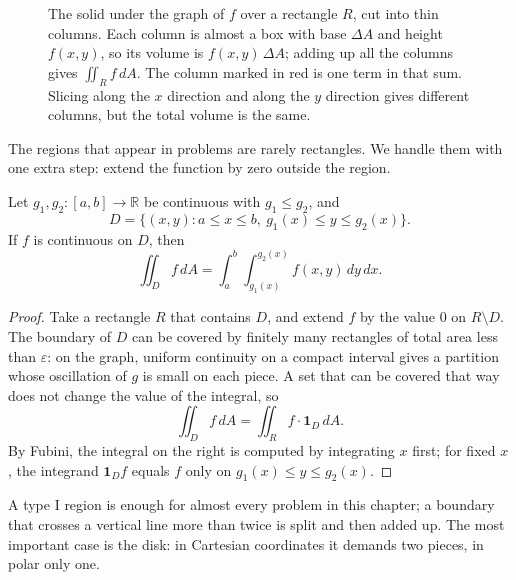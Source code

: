 \begin{figure}[htbp]
\caption{The solid under the graph of $f$ over a rectangle $R$, cut into
thin columns. Each column is almost a box with base $\Delta A$ and height
$f(x,y)$, so its volume is $f(x,y)\,\Delta A$; adding up all the columns gives
$\iint_R f\,dA$. The column marked in red is one term in that sum.
Slicing along the $x$ direction and along the $y$ direction gives different columns, but
the total volume is the same.}
\label{fig:kolom-tipis}
\end{figure}

The regions that appear in problems are rarely rectangles. We handle them
with one extra step: extend the function by zero outside the region.

\begin{lemma}
Let $g_{1},g_{2}\colon[a,b]\to\mathbb{R}$ be continuous with $g_{1}\le
g_{2}$, and
\[
D=\{(x,y): a\le x\le b,\ g_{1}(x)\le y\le g_{2}(x)\}.
\]
If $f$ is continuous on $D$, then
\[
\iint_{D}f\,dA=\int_{a}^{b}\!\!\int_{g_{1}(x)}^{g_{2}(x)}f(x,y)\,dy\,dx .
\]
\end{lemma}

\begin{proof}
Take a rectangle $R$ that contains $D$, and extend $f$ by the value $0$ on
$R\setminus D$. The boundary of $D$ can be covered by finitely many rectangles of
total area less than $\varepsilon$: on the graph, uniform continuity on a
compact interval gives a partition whose oscillation of $g$ is small on each piece.
A set that can be covered that way does not change the value of the integral, so
\[
\iint_{D}f\,dA=\iint_{R} f\cdot\mathbf{1}_{D}\,dA .
\]
By Fubini, the integral on the right is computed by integrating $x$ first;
for fixed $x$, the integrand $\mathbf{1}_{D}f$ equals $f$ only on
$g_{1}(x)\le y\le g_{2}(x)$.
\end{proof}

A type I region is enough for almost every problem in this chapter; a boundary that crosses a
vertical line more than twice is split and then added up. The most important case is the disk:
in Cartesian coordinates it demands two pieces, in polar only one.

